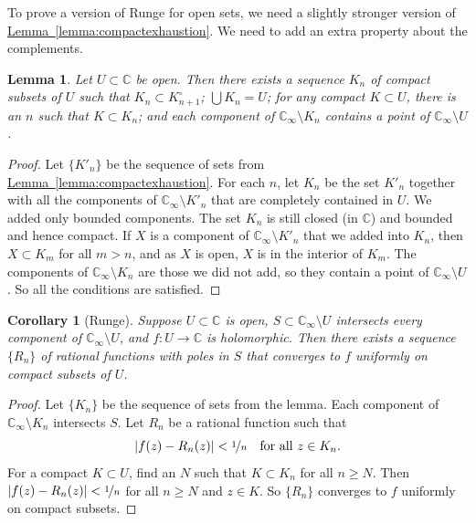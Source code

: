 \documentclass[12pt,openany]{book}
\newcommand{\abs}[1]{\left\lvert {#1} \right\rvert}
\newcommand{\C}{{\mathbb{C}}}
\theoremstyle{plain}
\newtheorem{lemma}[thm]{Lemma}
\newtheorem{cor}[thm]{Corollary}
\theoremstyle{remark}
\theoremstyle{definition}
\theoremstyle{exercise}
\theoremstyle{example}
\newcommand{\lemmaref}[1]{\hyperref[#1]{Lemma~\ref*{#1}}}
\begin{document}
To prove a version of Runge for open sets,
we need a slightly stronger version of
\lemmaref{lemma:compactexhaustion}.  We need to add 
an extra property about the complements.

\begin{lemma}\label{lemma:compactexhaustion2}
Let $U \subset \C$ be open.  Then there exists a sequence $K_n$
of compact subsets of $U$ such that $K_n \subset K^\circ_{n+1}$;
$\bigcup K_n = U$;
for any compact $K \subset U$, there is an $n$ such that $K \subset K_n$;
and each component of $\C_\infty \setminus K_n$ contains a point of
$\C_\infty \setminus U$.
\end{lemma}

\begin{proof}
Let $\{ K'_n \}$ be the sequence of sets from
\lemmaref{lemma:compactexhaustion}.
For each $n$, let $K_n$ be the set $K'_n$ together with all 
the components of $\C_\infty \setminus K'_n$ that are completely contained in $U$.
We added only bounded components.
The set $K_n$ is still closed (in $\C$) and bounded and hence compact.
If $X$ is a component of $\C_\infty \setminus K'_n$ that we added into
$K_n$, then $X \subset K_{m}$ for all $m > n$, and as $X$ is open,
$X$ is in the interior of $K_{m}$.
The components of $\C_\infty \setminus K_n$ are those
we did not add, so they contain a point of $\C_\infty \setminus U$.
So all the conditions are 
satisfied.
\end{proof}

\begin{cor}[Runge]
\label{cor:rungeseq}
Suppose $U \subset \C$ is open, $S \subset \C_{\infty} \setminus U$
intersects every component of $\C_\infty \setminus U$,
and $f \colon U \to \C$ is holomorphic.
Then there exists a sequence $\{ R_n \}$ of rational functions with poles in $S$
that converges to $f$ uniformly on compact subsets of $U$.
\end{cor}

\begin{proof}
Let $\{ K_n \}$ be the sequence of sets from the lemma.
Each component of $\C_\infty \setminus K_n$ intersects $S$.
Let $R_n$ be a rational function such that
\begin{equation*}
\abs{f(z)-R_n(z)} < \nicefrac{1}{n}
\quad
\text{for all } z \in K_n .
\end{equation*}
For a compact $K \subset U$, find an $N$ such that $K \subset K_n$ for
all $n \geq N$.  Then $\abs{f(z)-R_n(z)} < \nicefrac{1}{n}$ for all
$n \geq N$ and $z \in K$. So $\{ R_n \}$ converges to $f$ uniformly on compact subsets.
\end{proof}
\end{document}
